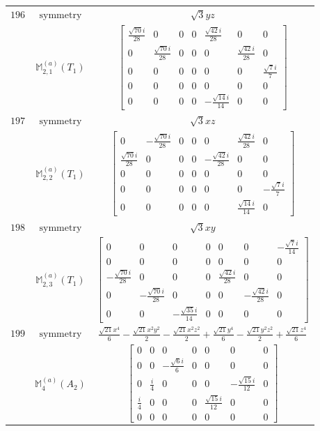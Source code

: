 \documentclass[fleqn,8pt,landscape]{jsarticle}
\begin{document}
\begin{longtable}{ccc}
$ 196 $ & $ \text{symmetry} $ & $ \sqrt{3} y z $ \\
$  $ & $ \mathbb{M}_{2,1}^{(a)}(T_{1}) $ & $ \begin{bmatrix} \frac{\sqrt{70} i}{28} & 0 & 0 & 0 & \frac{\sqrt{42} i}{28} & 0 & 0 \\ 0 & \frac{\sqrt{70} i}{28} & 0 & 0 & 0 & \frac{\sqrt{42} i}{28} & 0 \\ 0 & 0 & 0 & 0 & 0 & 0 & \frac{\sqrt{7} i}{7} \\ 0 & 0 & 0 & 0 & 0 & 0 & 0 \\ 0 & 0 & 0 & 0 & - \frac{\sqrt{14} i}{14} & 0 & 0 \end{bmatrix} $ \\ \hline
$ 197 $ & $ \text{symmetry} $ & $ \sqrt{3} x z $ \\
$  $ & $ \mathbb{M}_{2,2}^{(a)}(T_{1}) $ & $ \begin{bmatrix} 0 & - \frac{\sqrt{70} i}{28} & 0 & 0 & 0 & \frac{\sqrt{42} i}{28} & 0 \\ \frac{\sqrt{70} i}{28} & 0 & 0 & 0 & - \frac{\sqrt{42} i}{28} & 0 & 0 \\ 0 & 0 & 0 & 0 & 0 & 0 & 0 \\ 0 & 0 & 0 & 0 & 0 & 0 & - \frac{\sqrt{7} i}{7} \\ 0 & 0 & 0 & 0 & 0 & \frac{\sqrt{14} i}{14} & 0 \end{bmatrix} $ \\ \hline
$ 198 $ & $ \text{symmetry} $ & $ \sqrt{3} x y $ \\
$  $ & $ \mathbb{M}_{2,3}^{(a)}(T_{1}) $ & $ \begin{bmatrix} 0 & 0 & 0 & 0 & 0 & 0 & - \frac{\sqrt{7} i}{14} \\ 0 & 0 & 0 & 0 & 0 & 0 & 0 \\ - \frac{\sqrt{70} i}{28} & 0 & 0 & 0 & \frac{\sqrt{42} i}{28} & 0 & 0 \\ 0 & - \frac{\sqrt{70} i}{28} & 0 & 0 & 0 & - \frac{\sqrt{42} i}{28} & 0 \\ 0 & 0 & - \frac{\sqrt{35} i}{14} & 0 & 0 & 0 & 0 \end{bmatrix} $ \\ \hline
$ 199 $ & $ \text{symmetry} $ & $ \frac{\sqrt{21} x^{4}}{6} - \frac{\sqrt{21} x^{2} y^{2}}{2} - \frac{\sqrt{21} x^{2} z^{2}}{2} + \frac{\sqrt{21} y^{4}}{6} - \frac{\sqrt{21} y^{2} z^{2}}{2} + \frac{\sqrt{21} z^{4}}{6} $ \\
$  $ & $ \mathbb{M}_{4}^{(a)}(A_{2}) $ & $ \begin{bmatrix} 0 & 0 & 0 & 0 & 0 & 0 & 0 \\ 0 & 0 & - \frac{\sqrt{6} i}{6} & 0 & 0 & 0 & 0 \\ 0 & \frac{i}{4} & 0 & 0 & 0 & - \frac{\sqrt{15} i}{12} & 0 \\ \frac{i}{4} & 0 & 0 & 0 & \frac{\sqrt{15} i}{12} & 0 & 0 \\ 0 & 0 & 0 & 0 & 0 & 0 & 0 \end{bmatrix} $ \\ \hline

\end{longtable}
\end{document}
